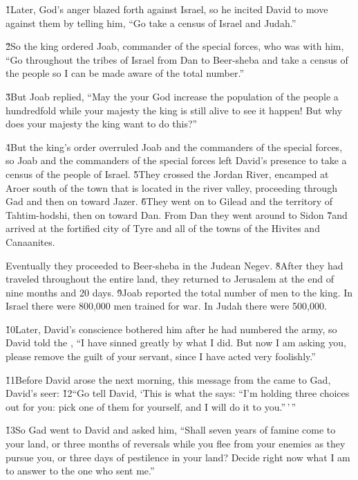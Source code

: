 \v{1}Later, God's anger blazed forth against Israel, so he incited David to move against them by telling him, ``Go take a census of Israel and Judah.''

\v{2}So the king ordered Joab, commander of the special forces, who was with him, ``Go throughout the tribes of Israel from Dan to Beer-sheba and take a census of the people so I can be made aware of the total number.''

\v{3}But Joab replied, ``May the  your God increase the population of the people a hundredfold while your majesty the king is still alive to see it happen! But why does your majesty the king want to do this?''

\v{4}But the king's order overruled Joab and the commanders of the special forces, so Joab and the commanders of the special forces left David's presence to take a census of the people of Israel. \v{5}They crossed the Jordan River, encamped at Aroer south of the town that is located in the river valley, proceeding through Gad and then on toward Jazer. \v{6}They went on to Gilead and the territory of Tahtim-hodshi, then on toward Dan. From Dan they went around to Sidon \v{7}and arrived at the fortified city of Tyre and all of the towns of the Hivites and Canaanites.

Eventually they proceeded to Beer-sheba in the Judean Negev. \v{8}After they had traveled throughout the entire land, they returned to Jerusalem at the end of nine months and 20 days. \v{9}Joab reported the total number of men to the king. In Israel there were 800,000 men trained for war. In Judah there were 500,000.

\v{10}Later, David's conscience bothered him after he had numbered the army, so David told the , ``I have sinned greatly by what I did. But now I am asking you, please remove the guilt of your servant, since I have acted very foolishly.''

\v{11}Before David arose the next morning, this message from the  came to Gad, David's seer: \v{12}``Go tell David, `This is what the  says: ``I'm holding three choices out for you: pick one of them for yourself, and I will do it to you.''\,'\,''

\v{13}So Gad went to David and asked him, ``Shall seven years of famine come to your land, or three months of reversals while you flee from your enemies as they pursue you, or three days of pestilence in your land? Decide right now what I am to answer to the one who sent me.''

